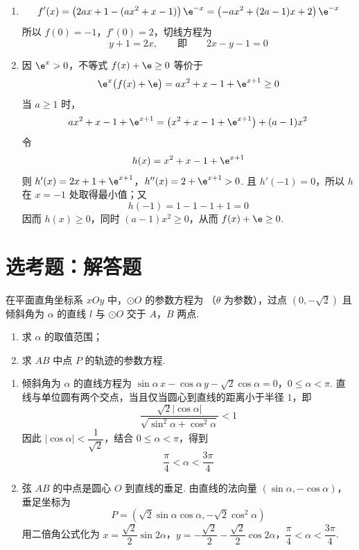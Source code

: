 \begin{solution}
\begin{enumerate}
    \item
    \[
    f'(x)=\left(2ax+1-(ax^2+x-1)\right)\e^{-x}
    =\left(-ax^2+(2a-1)x+2\right)\e^{-x}
    \]
    所以 \(f(0)=-1\)，\(f'(0)=2\)，切线方程为
    \[
    y+1=2x,
    \qquad\text{即}\qquad 2x-y-1=0
    \]

    \item 因 \(\e^x>0\)，不等式 \(f(x)+\e\ge0\) 等价于
    \[
    \e^x\bigl(f(x)+\e\bigr)
    =ax^2+x-1+\e^{x+1}\ge0
    \]
    当 \(a\ge1\) 时，
    \[
    ax^2+x-1+\e^{x+1}
    =\left(x^2+x-1+\e^{x+1}\right)+(a-1)x^2
    \]
    令
    \[
    h(x)=x^2+x-1+\e^{x+1}
    \]
    则
\(h'(x)=2x+1+\e^{x+1}\)，\(h''(x)=2+\e^{x+1}>0\).
    且 \(h'(-1)=0\)，所以 \(h\) 在 \(x=-1\) 处取得最小值；又
    \[
    h(-1)=1-1-1+1=0
    \]
    因而 \(h(x)\ge0\)，同时 \((a-1)x^2\ge0\)，从而 \(f(x)+\e\ge0\).
\end{enumerate}
\end{solution}

\section{选考题：解答题}

\begin{problem}
在平面直角坐标系 \(xOy\) 中，\(\odot O\) 的参数方程为
（\(\theta\) 为参数），过点 \((0,-\sqrt2)\) 且倾斜角为 \(\alpha\) 的直线 \(l\) 与 \(\odot O\) 交于 \(A\)，\(B\) 两点.

\begin{enumerate}
    \item 求 \(\alpha\) 的取值范围；
    \item 求 \(AB\) 中点 \(P\) 的轨迹的参数方程.
\end{enumerate}
\end{problem}

\begin{solution}
\begin{enumerate}
    \item 倾斜角为 \(\alpha\) 的直线方程为
\(\sin\alpha\,x-\cos\alpha\,y-\sqrt2\cos\alpha=0\)，\(0\le\alpha<\pi\).
    直线与单位圆有两个交点，当且仅当圆心到直线的距离小于半径 \(1\)，即
    \[
    \frac{\sqrt2|\cos\alpha|}{\sqrt{\sin^2\alpha+\cos^2\alpha}}<1
    \]
    因此 \(|\cos\alpha|<\dfrac1{\sqrt2}\)，结合 \(0\le\alpha<\pi\)，得到
    \[
    \frac\pi4<\alpha<\frac{3\pi}4
    \]

    \item 弦 \(AB\) 的中点是圆心 \(O\) 到直线的垂足. 由直线的法向量 \((\sin\alpha,-\cos\alpha)\)，垂足坐标为
    \[
    P=(\sqrt2\sin\alpha\cos\alpha,-\sqrt2\cos^2\alpha)
    \]
    用二倍角公式化为
\(x=\dfrac{\sqrt2}{2}\sin2\alpha\)，\(y=-\dfrac{\sqrt2}{2}-\dfrac{\sqrt2}{2}\cos2\alpha\)，\(\dfrac\pi4<\alpha<\dfrac{3\pi}4\).
\end{enumerate}
\end{solution}

